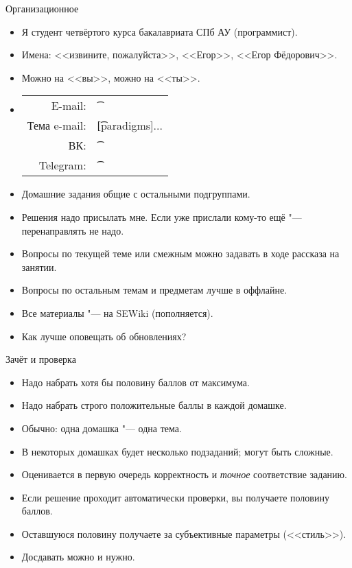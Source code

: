 \begin{frame}[t]{Организационное}
	\begin{itemize}
	\item Я студент четвёртого курса бакалавриата СПб АУ (программист).
	\item Имена: <<извините, пожалуйста>>, <<Егор>>, <<Егор Фёдорович>>.
	\item Можно на <<вы>>, можно на <<ты>>.
	\item
		\begin{tabular}{rl}
			E-mail: & \href{mailto:\EgorEmail?subject=[paradigms]}{\t{\EgorEmail}} \\
			Тема e-mail: & \t{[paradigms]...} \\
			ВК: & \href{https://vk.com/\EgorVk}{\t{\EgorVk}} \\
			Telegram: & \href{https://telegram.me/\EgorTelegram}{\t{\EgorTelegram}}
		\end{tabular}
	\item
		Домашние задания общие с остальными подгруппами.
	\item
		Решения надо присылать мне.
		Если уже прислали кому-то ещё "--- перенаправлять не надо.
	\item
		Вопросы по текущей теме или смежным можно задавать в ходе рассказа на занятии.
	\item
		Вопросы по остальным темам и предметам лучше в оффлайне.
	\item
		Все материалы "--- на SEWiki (пополняется).
	\item
		Как лучше оповещать об обновлениях?
	\end{itemize}
\end{frame}

\begin{frame}[t]{Зачёт и проверка}
	\begin{itemize}
		\item Надо набрать хотя бы половину баллов от максимума.
		\item Надо набрать строго положительные баллы в каждой домашке.
		\item Обычно: одна домашка "--- одна тема.
		\item В некоторых домашках будет несколько подзаданий; могут быть сложные.
		\item Оценивается в первую очередь корректность и \textit{точное} соответствие заданию.
		\item Если решение проходит автоматически проверки, вы получаете половину баллов.
		\item Оставшуюся половину получаете за субъективные параметры (<<стиль>>).
		\item Досдавать можно и нужно.
	\end{itemize}
\end{frame}

